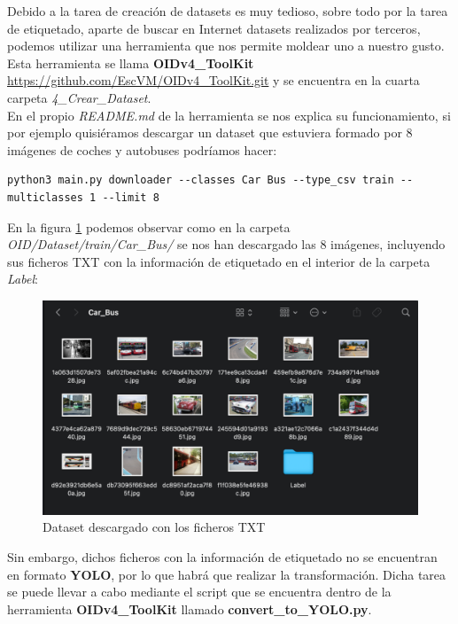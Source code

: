 Debido a la tarea de creación de datasets es muy tedioso, sobre todo por la tarea de etiquetado, aparte de buscar en Internet datasets realizados por terceros, podemos utilizar una herramienta que nos permite moldear uno a nuestro gusto. Esta herramienta se llama \textbf{OIDv4_ToolKit} \url{https://github.com/EscVM/OIDv4_ToolKit.git} y se encuentra en la cuarta carpeta \textit{4_Crear_Dataset}.\\

En el propio \textit{README.md} de la herramienta se nos explica su funcionamiento, si por ejemplo quisiéramos descargar un dataset que estuviera formado por 8 imágenes de coches y autobuses podríamos hacer:

\begin{lstlisting}
python3 main.py downloader --classes Car Bus --type_csv train --multiclasses 1 --limit 8
\end{lstlisting}

En la figura \ref{dataset} podemos observar como en la carpeta \textit{OID/Dataset/train/Car_Bus/} se nos han descargado las 8 imágenes, incluyendo sus ficheros TXT con la información de etiquetado en el interior de la carpeta \textit{Label}:

\begin{figure}[H]
	\centering
	\includegraphics[width=\textwidth]{Imagenes/AnexoI_Manual/AA/dataset.pdf}
	\caption{Dataset descargado con los ficheros TXT}
	\label{dataset}
\end{figure}

Sin embargo, dichos ficheros con la información de etiquetado no se encuentran en formato \textbf{YOLO}, por lo que habrá que realizar la transformación. Dicha tarea se puede llevar a cabo mediante el script que se encuentra dentro de la herramienta \textbf{OIDv4_ToolKit} llamado \textbf{convert_to_YOLO.py}. \\

